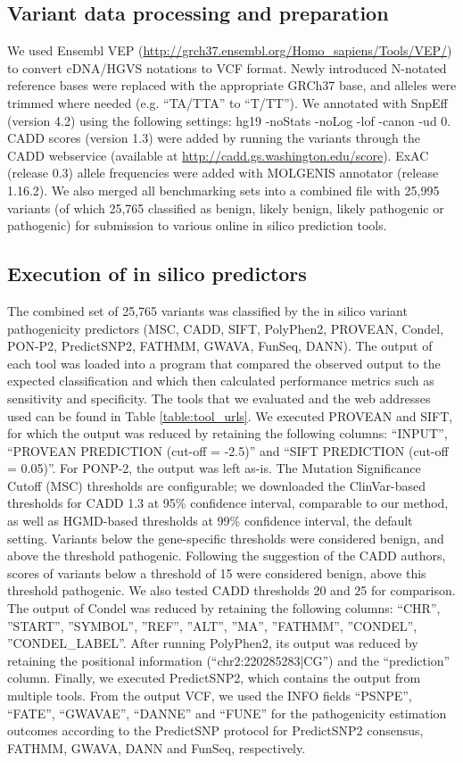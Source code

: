 \subsection{Variant data processing and preparation}
We used Ensembl VEP (\url{http://grch37.ensembl.org/Homo_sapiens/Tools/VEP/}) to convert cDNA/HGVS notations to VCF format.
Newly introduced N-notated reference bases were replaced with the appropriate GRCh37 base, and alleles were trimmed where needed (e.g. “TA/TTA” to “T/TT”).
We annotated with SnpEff (version 4.2) using the following settings: hg19 -noStats -noLog -lof -canon -ud 0.
CADD scores (version 1.3) were added by running the variants through the CADD webservice (available at \url{http://cadd.gs.washington.edu/score}).
ExAC (release 0.3) allele frequencies were added with MOLGENIS annotator (release 1.16.2).
We also merged all benchmarking sets into a combined file with 25,995 variants (of which 25,765 classified as benign, likely benign, likely pathogenic or pathogenic) for submission to various online in silico prediction tools.

\subsection{Execution of in silico predictors}
The combined set of 25,765 variants was classified by the in silico variant pathogenicity predictors (MSC, CADD, SIFT, PolyPhen2, PROVEAN, Condel, PON-P2, PredictSNP2, FATHMM, GWAVA, FunSeq, DANN).
The output of each tool was loaded into a program that compared the observed output to the expected classification and which then calculated performance metrics such as sensitivity and specificity.
The tools that we evaluated and the web addresses used can be found in Table \ref{table:tool_urls}.
We executed PROVEAN and SIFT, for which the output was reduced by retaining the following columns: “INPUT”, “PROVEAN PREDICTION (cut-off = -2.5)” and “SIFT PREDICTION (cut-off = 0.05)”.
For PONP-2, the output was left as-is.
The Mutation Significance Cutoff (MSC) thresholds are configurable; we downloaded the ClinVar-based thresholds for CADD 1.3 at 95\% confidence interval, comparable to our method, as well as HGMD-based thresholds at 99\% confidence interval, the default setting.
Variants below the gene-specific thresholds were considered benign, and above the threshold pathogenic.
Following the suggestion of the CADD authors, scores of variants below a threshold of 15 were considered benign, above this threshold pathogenic.
We also tested CADD thresholds 20 and 25 for comparison.
The output of Condel was reduced by retaining the following columns: “CHR”, ”START”, ”SYMBOL”, ”REF”, ”ALT”, ”MA”, ”FATHMM”, ”CONDEL”, ”CONDEL\_LABEL”.
After running PolyPhen2, its output was reduced by retaining the positional information (“chr2:220285283|CG”) and the “prediction” column.
Finally, we executed PredictSNP2, which contains the output from multiple tools.
From the output VCF, we used the INFO fields “PSNPE”, “FATE”, “GWAVAE”, “DANNE” and “FUNE” for the pathogenicity estimation outcomes according to the PredictSNP protocol for PredictSNP2 consensus, FATHMM, GWAVA, DANN and FunSeq, respectively.


